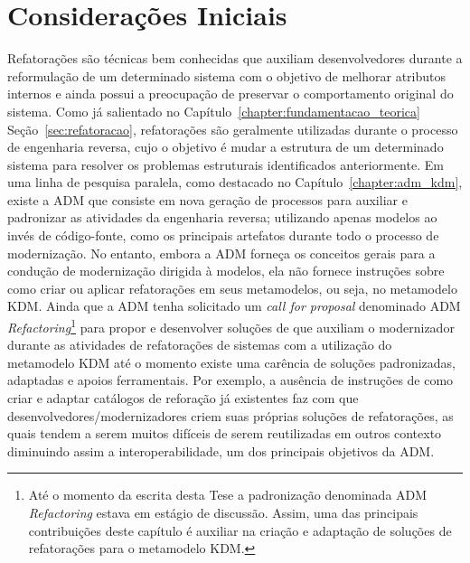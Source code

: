 \section{Considerações Iniciais}

Refatorações são técnicas bem conhecidas que auxiliam desenvolvedores durante a reformulação de um determinado sistema com o objetivo de melhorar atributos internos e ainda possui a preocupação de preservar o comportamento original do sistema. Como já salientado no Capítulo~\ref{chapter:fundamentacao_teorica} Seção~\ref{sec:refatoracao}, refatorações são geralmente utilizadas durante o processo de engenharia reversa, cujo o objetivo é mudar a estrutura de um determinado sistema para resolver os problemas estruturais identificados anteriormente. Em uma linha de pesquisa paralela, como destacado no Capítulo~\ref{chapter:adm_kdm}, existe a ADM que consiste em nova geração de processos para auxiliar e padronizar as atividades da engenharia reversa; utilizando apenas modelos ao invés de código-fonte, como os principais artefatos durante todo o processo de modernização. No entanto, embora a ADM forneça os conceitos gerais para a condução de modernização dirigida à modelos, ela não fornece instruções sobre como criar ou aplicar refatorações em seus metamodelos, ou seja, no metamodelo KDM. Ainda que a ADM tenha solicitado um \textit{call for proposal} denominado ADM \textit{Refactoring}\footnote{Até o momento da escrita desta Tese a padronização denominada ADM \textit{Refactoring} estava em estágio de discussão. Assim, uma das principais contribuições deste capítulo é auxiliar na criação e adaptação de soluções de refatorações para o metamodelo KDM.} para propor e desenvolver soluções de que auxiliam o modernizador durante as atividades de refatorações de sistemas com a utilização do metamodelo KDM até o momento existe uma carência de soluções padronizadas, adaptadas e apoios ferramentais. Por exemplo, a ausência de instruções de como criar e adaptar catálogos de reforação já existentes faz com que desenvolvedores/modernizadores criem suas próprias soluções de refatorações, as quais tendem a serem muitos difíceis de serem reutilizadas em outros contexto diminuindo assim a interoperabilidade, um dos principais objetivos da ADM.

